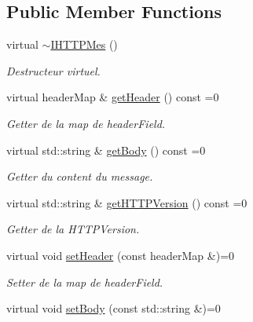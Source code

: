 \subsection*{Public Member Functions}
\begin{DoxyCompactItemize}
\item 
\hypertarget{class_a_p_i_tree_friends_1_1_i_h_t_t_p_mes_a9d671b44f990cfe1c2d06af3962bf40c}{}virtual \hyperlink{class_a_p_i_tree_friends_1_1_i_h_t_t_p_mes_a9d671b44f990cfe1c2d06af3962bf40c}{$\sim$\+I\+H\+T\+T\+P\+Mes} ()\label{class_a_p_i_tree_friends_1_1_i_h_t_t_p_mes_a9d671b44f990cfe1c2d06af3962bf40c}

\begin{DoxyCompactList}\small\item\em Destructeur virtuel. \end{DoxyCompactList}\item 
virtual header\+Map \& \hyperlink{class_a_p_i_tree_friends_1_1_i_h_t_t_p_mes_ad261be47595863d925454ece7cf6770c}{get\+Header} () const =0
\begin{DoxyCompactList}\small\item\em Getter de la map de header\+Field. \end{DoxyCompactList}\item 
virtual std\+::string \& \hyperlink{class_a_p_i_tree_friends_1_1_i_h_t_t_p_mes_af114cd093f3194e88cf3d7b53d5737dd}{get\+Body} () const =0
\begin{DoxyCompactList}\small\item\em Getter du content du message. \end{DoxyCompactList}\item 
virtual std\+::string \& \hyperlink{class_a_p_i_tree_friends_1_1_i_h_t_t_p_mes_a41344a96f709479105f08437cf04ddcc}{get\+H\+T\+T\+P\+Version} () const =0
\begin{DoxyCompactList}\small\item\em Getter de la H\+T\+T\+P\+Version. \end{DoxyCompactList}\item 
virtual void \hyperlink{class_a_p_i_tree_friends_1_1_i_h_t_t_p_mes_a8c59430bfa4a76642ee25994f79957be}{set\+Header} (const header\+Map \&)=0
\begin{DoxyCompactList}\small\item\em Setter de la map de header\+Field. \end{DoxyCompactList}\item 
virtual void \hyperlink{class_a_p_i_tree_friends_1_1_i_h_t_t_p_mes_abd0e52a282e862032935cac8eefa2fe0}{set\+Body} (const std\+::string \&)=0

\end{DoxyCompactItemize}
